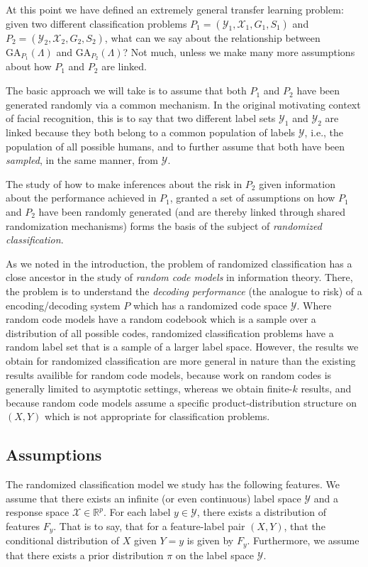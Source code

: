 \documentclass[12pt]{article}
\begin{document}
At this point we have defined an extremely general transfer learning
problem: given two different classification problems $P_1 =
(\mathcal{Y}_1, \mathcal{X}_1, G_1, S_1)$ and $P_2 = (\mathcal{Y}_2,
\mathcal{X}_2, G_2, S_2)$, what can we say about the relationship
between $\text{GA}_{P_1}(\Lambda)$ and $\text{GA}_{P_2}(\Lambda)$?
Not much, unless we make many more assumptions about how $P_1$ and
$P_2$ are linked.

The basic approach we will take is to assume that both $P_1$ and $P_2$
have been generated randomly via a common mechanism.  In the original
motivating context of facial recognition, this is to say that two
different label sets $\mathcal{Y}_1$ and $\mathcal{Y}_2$ are linked
because they both belong to a common population of labels
$\mathcal{Y}$, i.e., the population of all possible humans, and to
further assume that both have been \emph{sampled}, in the same manner,
from $\mathcal{Y}$.

The study of how to make inferences about the risk in $P_2$ given
information about the performance achieved in $P_1$, granted a set of
assumptions on how $P_1$ and $P_2$ have been randomly generated (and
are thereby linked through shared randomization mechanisms) forms the
basis of the subject of \emph{randomized classification}.

As we noted in the introduction, the problem of randomized
classification has a close ancestor in the study of \emph{random code
  models} in information theory.  There, the problem is to understand
the \emph{decoding performance} (the analogue to risk) of a
encoding/decoding system $P$ which has a randomized code space
$\mathcal{Y}$.  Where random code models have a random codebook which
is a sample over a distribution of all possible codes, randomized
classification problems have a random label set that is a sample of a
larger label space.  However, the results we obtain for randomized
classification are more general in nature than the existing results
availible for random code models, because work on random codes is
generally limited to asymptotic settings, whereas we obtain finite-$k$
results, and because random code models assume a specific
product-distribution structure on $(X, Y)$ which is not appropriate
for classification problems.

\subsection{Assumptions}

The randomized classification model we study has the following
features.  We assume that there exists an infinite (or even
continuous) label space $\mathcal{Y}$ and a response space
$\mathcal{X} \in \mathbb{R}^p$.  For each label $y \in \mathcal{Y}$,
there exists a distribution of features $F_y$.  That is to say, that
for a feature-label pair $(X, Y)$, that the conditional distribution
of $X$ given $Y = y$ is given by $F_y$.  Furthermore, we assume that
there exists a prior distribution $\pi$ on the label space $\mathcal{Y}$.
\end{document}
